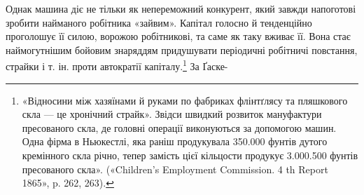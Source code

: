 Однак машина діє не тільки як непереможний конкурент,
який завжди напоготові зробити найманого робітника «зайвим».
Капітал голосно й тенденційно проголошує її силою, ворожою
робітникові, та саме як таку вживає її. Вона стає наймогутнішим
бойовим знаряддям придушувати періодичні робітничі повстання,
страйки і т. ін. проти автократії капіталу.\footnote{
«Відносини між хазяїнами й руками по фабриках флінтґлясу та пляшкового
скла — це хронічний страйк». Звідси швидкий розвиток мануфактури
пресованого скла, де головні операції виконуються за допомогою машин.
Одна фірма в Ньюкестлі, яка раніш продукувала 350.000 фунтів дутого
кремінного скла річно, тепер замість цієї кільцости продукує 3.000.500
фунтів пресованого скла». («Children’s Employment Commission. 4 th
Report 1865», p. 262, 263).
} За Ґаске-